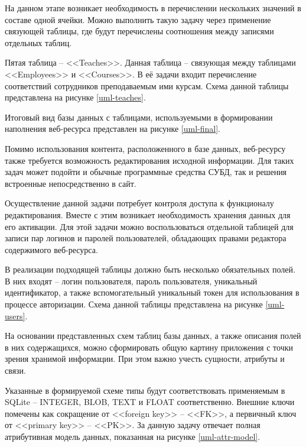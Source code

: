 На данном этапе возникает необходимость в перечислении нескольких значений в составе одной ячейки.
Можно выполнить такую задачу через применение связующей таблицы, где будут перечислены соотношения между записями отдельных таблиц.

Пятая таблица -- <<Teaches>>.
Данная таблица -- связующая между таблицами <<Employees>> и <<Courses>>.
В её задачи входит перечисление соответствий сотрудников преподаваемым ими курсам.
Схема данной таблицы представлена на рисунке \ref{uml-teaches}.

Итоговый вид базы данных с таблицами, используемыми в формировании наполнения веб-ресурса представлен на рисунке \ref{uml-final}.

Помимо использования контента, расположенного в базе данных, веб-ресурсу также требуется возможность редактирования исходной информации.
Для таких задач может подойти и обычные программные средства СУБД, так и решения встроенные непосредственно в сайт.

Осуществление данной задачи потребует контроля доступа к функционалу редактирования.
Вместе с этим возникает необходимость хранения данных для его активации.
Для этой задачи можно воспользоваться отдельной таблицей для записи пар логинов и паролей пользователей, обладающих правами редактора содержимого веб-ресурса.

В реализации подходящей таблицы должно быть несколько обязательных полей.
В них входят -- логин пользователя, пароль пользователя, уникальный идентификатор, а также вспомогательный уникальный токен для использования в процессе авторизации.
Схема данной таблицы представлена на рисунке \ref{uml-users}.

На основании представленных схем таблиц базы данных, а также описания полей в них содержащихся, можно сформировать общую картину приложения с точки зрения хранимой информации.
При этом важно учесть сущности, атрибуты и связи.

Указанные в формируемой схеме типы будут соответствовать применяемым в SQLite -- INTEGER, BLOB, TEXT и FLOAT соответственно.
Внешние ключи помечены как сокращение от <<foreign key>> -- <<FK>>, а первичный ключ от <<primary key>> -- <<PK>>.
За данную задачу отвечает полная атрибутивная модель данных, показанная на рисунке \ref{uml-attr-model}.

